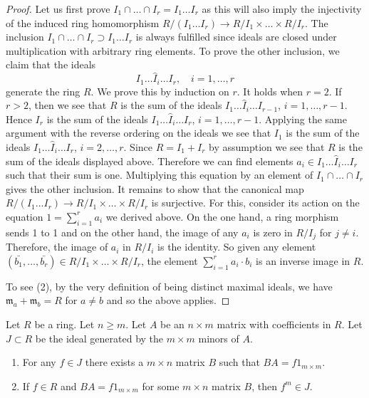 \begin{proof}
Let us first prove $I_1 \cap \ldots \cap I_r = I_1 \ldots I_r$
as this will also imply the injectivity of the induced ring
homomorphism $R/(I_1 \ldots I_r) \rightarrow R/I_1 \times \ldots \times R/I_r$.
The inclusion $I_1 \cap \ldots \cap I_r \supset I_1 \ldots I_r$ is always
fulfilled since ideals are closed under multiplication with arbitrary ring
elements. To prove the other inclusion, we claim that the ideals
$$
I_1 \ldots \hat I_i \ldots I_r,\quad i = 1, \ldots, r
$$
generate the ring $R$. We prove this by induction on $r$. It holds when
$r = 2$. If $r > 2$, then we see that $R$ is the sum of the ideals
$I_1 \ldots \hat I_i \ldots I_{r - 1}$, $i = 1, \ldots, r - 1$.
Hence $I_r$ is the sum of the ideals
$I_1 \ldots \hat I_i \ldots I_r$, $i = 1, \ldots, r - 1$.
Applying the same argument with the reverse ordering on the ideals
we see that $I_1$ is the sum of the ideals
$I_1 \ldots \hat I_i \ldots I_r$, $i = 2, \ldots, r$.
Since $R = I_1 + I_r$ by assumption we see that $R$ is the sum of the
ideals displayed above. Therefore we can find elements
$a_i \in I_1 \ldots \hat I_i \ldots I_r$
such that their sum is one. Multiplying this equation by an element
of $I_1 \cap \ldots \cap I_r$ gives the other inclusion.
It remains to show that the canonical map
$R/(I_1 \ldots I_r) \rightarrow R/I_1 \times \ldots \times R/I_r$
is surjective. For this, consider its action on the equation
$1 = \sum_{i=1}^r a_i$ we derived above. On the one hand, a
ring morphism sends 1 to 1 and on the other hand, the image of any
$a_i$ is zero in $R/I_j$ for $j \neq i$. Therefore, the image of $a_i$
in $R/I_i$ is the identity. So given any element
$(\bar{b_1}, \ldots, \bar{b_r}) \in R/I_1 \times \ldots \times R/I_r$,
the element $\sum_{i=1}^r a_i \cdot b_i$ is an inverse image in $R$.

\medskip\noindent
To see (2), by the very definition of being distinct maximal ideals, we have
$\mathfrak{m}_a + \mathfrak{m}_b = R$ for $a \neq b$ and so the above applies.
\end{proof}

\begin{lemma}
\label{lemma-matrix-left-inverse}
Let $R$ be a ring. Let $n \geq m$. Let $A$ be an
$n \times m$ matrix with coefficients in $R$. Let $J \subset R$
be the ideal generated by the $m \times m$ minors of $A$.
\begin{enumerate}
\item For any $f \in J$ there exists a $m \times n$ matrix $B$
such that $BA = f 1_{m \times m}$.
\item If $f \in R$ and $BA = f 1_{m \times m}$ for some $m \times n$ matrix
$B$, then $f^m \in J$.
\end{enumerate}
\end{lemma}

